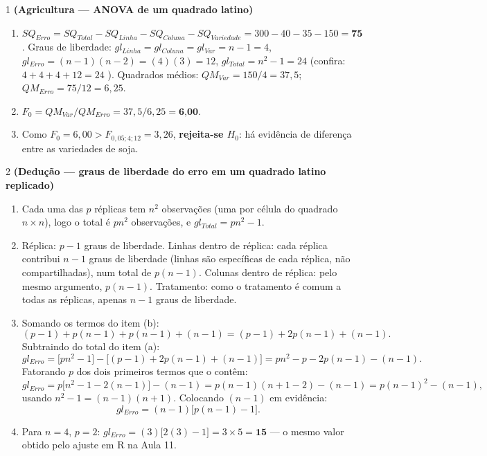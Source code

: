 \documentclass[11pt]{article}
\begin{document}

\begin{questao}{1} \textbf{(Agricultura --- ANOVA de um quadrado latino)}
\end{questao}
\begin{solucao}
\begin{enumerate}[label=(\alph*)]
  \item $SQ_{Erro} = SQ_{Total} - SQ_{Linha} - SQ_{Coluna} - SQ_{Variedade}
    = 300-40-35-150 = \textbf{75}$. Graus de liberdade: $gl_{Linha}=gl_{Coluna}=gl_{Var}=n-1=4$,
    $gl_{Erro}=(n-1)(n-2)=(4)(3)=12$, $gl_{Total}=n^2-1=24$ (confira: $4+4+4+12=24$
    \checkmark). Quadrados médios: $QM_{Var}=150/4=37{,}5$; $QM_{Erro}=75/12=6{,}25$.
  \item $F_0 = QM_{Var}/QM_{Erro} = 37{,}5/6{,}25 = \textbf{6{,}00}$.
  \item Como $F_0=6{,}00 > F_{0{,}05;4;12}=3{,}26$, \textbf{rejeita-se $H_0$}: há evidência de
    diferença entre as variedades de soja.
\end{enumerate}
\end{solucao}

\begin{questao}{2} \textbf{(Dedução --- graus de liberdade do erro em um quadrado latino replicado)}
\end{questao}
\begin{solucao}
\begin{enumerate}[label=(\alph*)]
  \item Cada uma das $p$ réplicas tem $n^2$ observações (uma por célula do quadrado $n\times n$),
    logo o total é $pn^2$ observações, e $gl_{Total}=pn^2-1$.
  \item Réplica: $p-1$ graus de liberdade. Linhas dentro de réplica: cada réplica contribui
    $n-1$ graus de liberdade (linhas são específicas de cada réplica, não compartilhadas), num
    total de $p(n-1)$. Colunas dentro de réplica: pelo mesmo argumento, $p(n-1)$. Tratamento:
    como o tratamento é comum a todas as réplicas, apenas $n-1$ graus de liberdade.
  \item Somando os termos do item (b):
    $$
    (p-1) + p(n-1) + p(n-1) + (n-1) = (p-1) + 2p(n-1) + (n-1).
    $$
    Subtraindo do total do item (a):
    $$
    gl_{Erro} = \big[pn^2-1\big] - \big[(p-1)+2p(n-1)+(n-1)\big]
              = pn^2 - p - 2p(n-1) - (n-1).
    $$
    Fatorando $p$ dos dois primeiros termos que o contêm:
    $$
    gl_{Erro} = p\big[n^2-1-2(n-1)\big] - (n-1) = p(n-1)(n+1-2) - (n-1) = p(n-1)^2 - (n-1),
    $$
    usando $n^2-1=(n-1)(n+1)$. Colocando $(n-1)$ em evidência:
    $$
    gl_{Erro} = (n-1)\big[p(n-1)-1\big].
    $$
  \item Para $n=4$, $p=2$: $gl_{Erro} = (3)\big[2(3)-1\big] = 3\times5 = \textbf{15}$ — o mesmo
    valor obtido pelo ajuste em R na Aula 11.
\end{enumerate}
\end{solucao}
\end{document}
